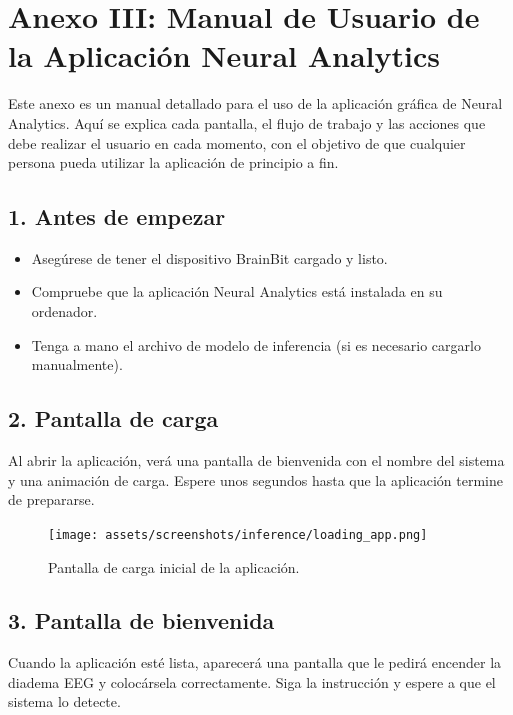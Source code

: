 \chapter*{Anexo III: Manual de Usuario de la Aplicación Neural Analytics}

Este anexo es un manual detallado para el uso de la aplicación gráfica de Neural Analytics. Aquí se explica cada pantalla, el flujo de trabajo y las acciones que debe realizar el usuario en cada momento, con el objetivo de que cualquier persona pueda utilizar la aplicación de principio a fin.

\section*{1. Antes de empezar}
\begin{itemize}
    \item Asegúrese de tener el dispositivo BrainBit cargado y listo.
    \item Compruebe que la aplicación Neural Analytics está instalada en su ordenador.
    \item Tenga a mano el archivo de modelo de inferencia (si es necesario cargarlo manualmente).
\end{itemize}

\section*{2. Pantalla de carga}
Al abrir la aplicación, verá una pantalla de bienvenida con el nombre del sistema y una animación de carga. Espere unos segundos hasta que la aplicación termine de prepararse.

\begin{figure}[h!]
    \centering
    \texttt{[image: assets/screenshots/inference/loading\_app.png]}
    \caption{Pantalla de carga inicial de la aplicación.}
\end{figure}

\section*{3. Pantalla de bienvenida}
Cuando la aplicación esté lista, aparecerá una pantalla que le pedirá encender la diadema EEG y colocársela correctamente. Siga la instrucción y espere a que el sistema lo detecte.

